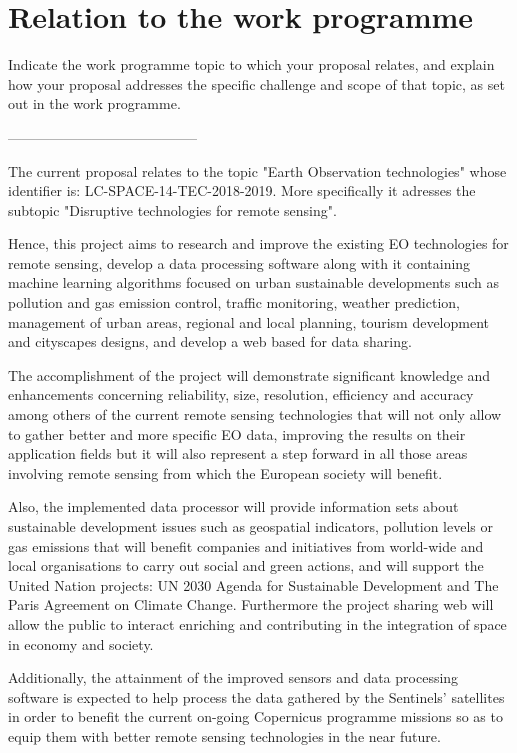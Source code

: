 \section{Relation to the work programme}

Indicate the work programme topic to which your proposal relates, and explain how your proposal addresses the specific challenge and scope of that topic, as set out in the work programme.

-----------------------------------------

The current proposal relates to the topic "Earth Observation technologies" whose identifier is: LC-SPACE-14-TEC-2018-2019. More specifically it adresses the subtopic "Disruptive technologies for remote sensing". 

Hence, this project aims to research and improve the existing EO technologies for remote sensing, develop a data processing software along with it containing machine learning algorithms focused on urban sustainable developments such as pollution and gas emission control, traffic monitoring, weather prediction, management of urban areas, regional and local planning, tourism development and cityscapes designs, and develop a web based for data sharing. 


The accomplishment of the project will demonstrate significant knowledge and enhancements concerning reliability, size, resolution, efficiency and accuracy among others of the current remote sensing technologies that will not only allow to gather better and more specific EO data, improving the results on their application fields but it will also represent a step forward in all those areas involving remote sensing from which the European society will benefit. 

Also, the implemented data processor will provide information sets about sustainable development issues such as geospatial indicators, pollution levels or gas emissions that will benefit companies and initiatives from world-wide and local organisations to carry out social and green actions, and will support the United Nation projects: UN 2030 Agenda for Sustainable Development and The Paris Agreement on Climate Change. Furthermore the project sharing web will allow the public to interact enriching and contributing in the integration of space in economy and society.
 
Additionally, the attainment of the improved sensors and data processing software is expected to help process the data gathered by the Sentinels' satellites in order to benefit the current on-going Copernicus programme missions so as to equip them with better remote sensing technologies in the near future.  
